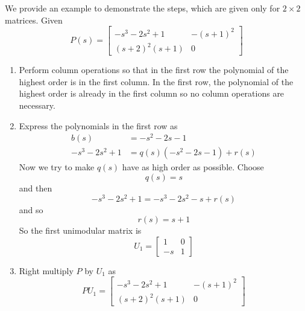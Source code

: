 \begin{example}
  We provide an example to demonstrate the steps, which are given only for $2\times2$ matrices.
  Given
  \begin{equation*}
    P(s)=
    \begin{bmatrix}
      -s^{3}-2s^{2}+1 & -(s+1)^{2} \\
      (s+2)^{2}(s+1) & 0
    \end{bmatrix}
  \end{equation*}
  \begin{enumerate}
    \item{Perform column operations so that in the first row the polynomial of the highest order is in the first column.
    In the first row, the polynomial of the highest order is already in the first column so no column operations are necessary.}
    \item{Express the polynomials in the first row as}
    \begin{equation*}
      \begin{split}
        b(s)&=-s^{2}-2s-1 \\
        -s^{3}-2s^{2}+1&=q(s)(-s^{2}-2s-1)+r(s)
      \end{split}
    \end{equation*}
    Now we try to make $q(s)$ have as high order as possible.
    Choose
    \begin{equation*}
      q(s)=s
    \end{equation*}
    and then
    \begin{equation*}
      -s^{3}-2s^{2}+1=-s^{3}-2s^{2}-s+r(s)
    \end{equation*}
    and so
    \begin{equation*}
      r(s)=s+1
    \end{equation*}
    So the first unimodular matrix is
    \begin{equation*}
      U_{1}=
      \begin{bmatrix}
        1 & 0 \\
        -s & 1
      \end{bmatrix}
    \end{equation*}
    \item{Right multiply $P$ by $U_{1}$ as}
    \begin{equation*}
      PU_{1}=
      \begin{bmatrix}
        -s^{3}-2s^{2}+1 & -(s+1)^{2} \\
        (s+2)^{2}(s+1) & 0
      \end{bmatrix}

\end{equation*}
\end{enumerate}
\end{example}
